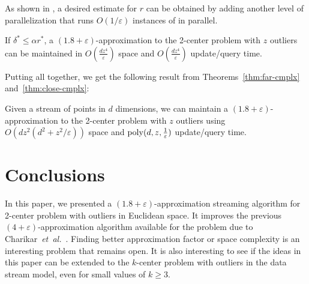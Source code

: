 \documentclass[envcountsame]{cls/cccg15}
\renewcommand{\O}{\ensuremath{{O}}}
\newcommand{\poly}{\mathop{\mathrm{poly}}}
\newcommand{\lee}{\leqslant}
\newcommand{\gee}{\geqslant}
\renewcommand{\leq}{\lee}
\renewcommand{\ge}{\gee}
\newcommand{\eps}{\varepsilon}
\newcommand{\etal}{{\em et~al.\/}}
\begin{document}

\noindent
As shown in , a desired estimate for $r$ can be
obtained by adding another level of 
parallelization that runs $O(1/\eps)$ instances of  in parallel.


\begin{theorem}
\label{thm:close-cmplx}
	If $\delta^* \leq \alpha r^*$, a $(1.8 + \eps)$-approximation to the 2-center problem with $z$ outliers 
	can be maintained in $\O(\frac{dz^4}{\eps})$ space 
	and $\O(\frac{dz^4}{\eps})$ update/query time.
\end{theorem}


\noindent
Putting all together, we get the following result
from Theorems~\ref{thm:far-cmplx} and~\ref{thm:close-cmplx}:

\begin{theorem} \label{thm:1-center-stream}
	Given a stream of points in $d$ dimensions,
	we can maintain a $(1.8 + \eps)$-approximation to 
	the 2-center problem with $z$ outliers using 
	$\O(dz^2 (d^2 + z^2/\eps))$ space and 
	$\poly(d, z, {1 \over \eps})$ update/query time.
\end{theorem}


%


\section{Conclusions}
\label{sec:conc}

In this paper, we presented a $(1.8 + \eps)$-approximation streaming algorithm for 2-center problem with outliers in Euclidean space.
It improves the previous $(4+\eps)$-approximation algorithm available for the problem 
due to Charikar~\etal~\cite{mccutchen2008streaming}. 
Finding better approximation factor or space complexity
is an interesting problem that remains open.
It is also interesting to see if the ideas in this paper 
can be extended to the $k$-center problem with outliers in the data stream model,
even for small values of $k \ge 3$.
\end{document}
